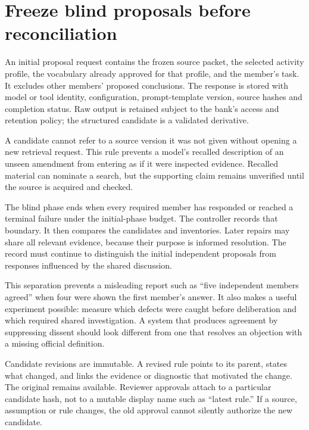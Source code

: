 \section{Freeze blind proposals before reconciliation}
\label{merge:M06:04}


An initial proposal request contains the frozen source packet, the selected
activity profile, the vocabulary already approved for that profile, and the
member's task. It excludes other members' proposed conclusions. The response is
stored with model or tool identity, configuration, prompt-template version, source
hashes and completion status. Raw output is retained subject to the bank's access
and retention policy; the structured candidate is a validated derivative.

A candidate cannot refer to a source version it was not given without opening a
new retrieval request. This rule prevents a model's recalled description of an
unseen amendment from entering as if it were inspected evidence. Recalled
material can nominate a search, but the supporting claim remains unverified
until the source is acquired and checked.


The blind phase ends when every required member has responded or reached a
terminal failure under the initial-phase budget. The controller records that
boundary. It then compares the candidates and inventories. Later repairs may
share all relevant evidence, because their purpose is informed resolution. The
record must continue to distinguish the initial independent proposals from
responses influenced by the shared discussion.

This separation prevents a misleading report such as ``five independent members
agreed'' when four were shown the first member's answer. It also makes a useful
experiment possible: measure which defects were caught before deliberation and
which required shared investigation. A system that produces agreement by
suppressing dissent should look different from one that resolves an objection
with a missing official definition.

Candidate revisions are immutable. A revised rule points to its parent, states
what changed, and links the evidence or diagnostic that motivated the change.
The original remains available. Reviewer approvals attach to a particular
candidate hash, not to a mutable display name such as ``latest rule.'' If a
source, assumption or rule changes, the old approval cannot silently authorize
the new candidate.

